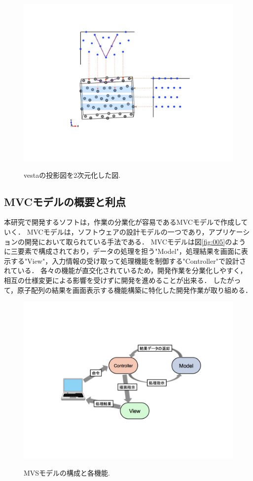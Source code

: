 \begin{figure}[htbp]\begin{center}
\includegraphics[width=12cm,bb= 0 0 937 753]{../figs/./boundary_narita.007.jpeg}
\caption{vestaの投影図を2次元化した図.}
\label{fig:007}
\label{default}\end{center}\end{figure}
\subsection{MVCモデルの概要と利点}
本研究で開発するソフトは，作業の分業化が容易であるMVCモデルで作成していく．
MVCモデルは，ソフトウェアの設計モデルの一つであり，アプリケーションの開発において取られている手法である．
MVCモデルは図\ref{fig:005}のように三要素で構成されており，データの処理を担う"Model"，処理結果を画面に表示する"View"，入力情報の受け取って処理機能を制御する"Controller"で設計されている．
各々の機能が直交化されているため，開発作業を分業化しやすく，相互の仕様変更による影響を受けずに開発を進めることが出来る\cite{MVC}．
したがって，原子配列の結果を画面表示する機能構築に特化した開発作業が取り組める．

\begin{figure}[htbp]\begin{center}
\includegraphics[width=12cm,bb= 0 0 937 753]{../figs/./boundary_narita.005.jpeg}
\caption{MVSモデルの構成と各機能.}
\label{fig:005}
\label{default}\end{center}\end{figure}
